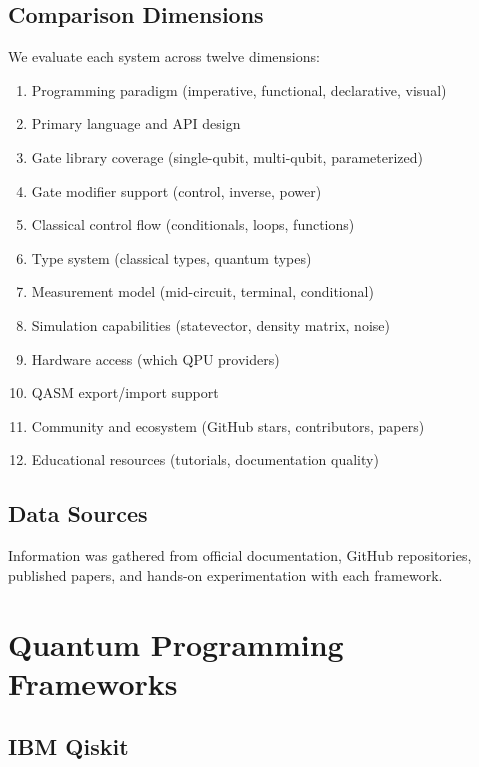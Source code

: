 \documentclass[journal]{IEEEtran}
\begin{document}
\subsection{Comparison Dimensions}

We evaluate each system across twelve dimensions:
\begin{enumerate}
    \item Programming paradigm (imperative, functional, declarative, visual)
    \item Primary language and API design
    \item Gate library coverage (single-qubit, multi-qubit, parameterized)
    \item Gate modifier support (control, inverse, power)
    \item Classical control flow (conditionals, loops, functions)
    \item Type system (classical types, quantum types)
    \item Measurement model (mid-circuit, terminal, conditional)
    \item Simulation capabilities (statevector, density matrix, noise)
    \item Hardware access (which QPU providers)
    \item QASM export/import support
    \item Community and ecosystem (GitHub stars, contributors, papers)
    \item Educational resources (tutorials, documentation quality)
\end{enumerate}

\subsection{Data Sources}

Information was gathered from official documentation, GitHub repositories, published papers, and hands-on experimentation with each framework.

\section{Quantum Programming Frameworks}
\label{sec:frameworks}

\subsection{IBM Qiskit}
\end{document}
